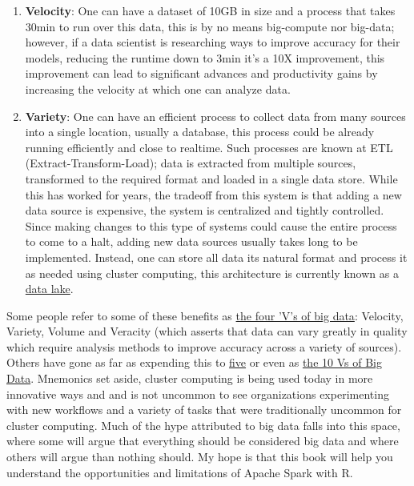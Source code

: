 \documentclass[]{book}
\theoremstyle{definition}
\theoremstyle{definition}
\theoremstyle{definition}
\theoremstyle{remark}
\begin{document}
\begin{enumerate}
\def\labelenumi{\arabic{enumi}.}
\item
  \textbf{Velocity}: One can have a dataset of 10GB in size and a
  process that takes 30min to run over this data, this is by no means
  big-compute nor big-data; however, if a data scientist is researching
  ways to improve accuracy for their models, reducing the runtime down
  to 3min it's a 10X improvement, this improvement can lead to
  significant advances and productivity gains by increasing the velocity
  at which one can analyze data.
\item
  \textbf{Variety}: One can have an efficient process to collect data
  from many sources into a single location, usually a database, this
  process could be already running efficiently and close to realtime.
  Such processes are known at ETL (Extract-Transform-Load); data is
  extracted from multiple sources, transformed to the required format
  and loaded in a single data store. While this has worked for years,
  the tradeoff from this system is that adding a new data source is
  expensive, the system is centralized and tightly controlled. Since
  making changes to this type of systems could cause the entire process
  to come to a halt, adding new data sources usually takes long to be
  implemented. Instead, one can store all data its natural format and
  process it as needed using cluster computing, this architecture is
  currently known as a
  \href{https://en.wikipedia.org/wiki/Data_lake}{data lake}.
\end{enumerate}

Some people refer to some of these benefits as
\href{http://www.theserverside.com/feature/Handling-the-four-Vs-of-big-data-volume-velocity-variety-and-veracity}{the
four 'V's of big data}: Velocity, Variety, Volume and Veracity (which
asserts that data can vary greatly in quality which require analysis
methods to improve accuracy across a variety of sources). Others have
gone as far as expending this to
\href{https://en.wikipedia.org/wiki/Big_data}{five} or even as
\href{https://tdwi.org/articles/2017/02/08/10-vs-of-big-data.aspx}{the
10 Vs of Big Data}. Mnemonics set aside, cluster computing is being used
today in more innovative ways and and is not uncommon to see
organizations experimenting with new workflows and a variety of tasks
that were traditionally uncommon for cluster computing. Much of the hype
attributed to big data falls into this space, where some will argue that
everything should be considered big data and where others will argue
than nothing should. My hope is that this book will help you understand
the opportunities and limitations of Apache Spark with R.
\end{document}
